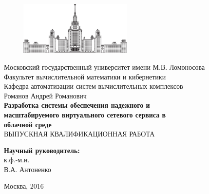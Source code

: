 \documentclass[oneside,final,14pt,a4paper]{extreport}
\begin{document}
\thispagestyle{empty}
\begin{titlepage}

\begin{figure}
	\centering
	\includegraphics[width=0.5\textwidth]{logo.eps}\\
\end{figure}

\begin{spacing}{1.0} %
\begin{center} %
	{\small
		Московский государственный университет имени М.В. Ломоносова \\
		Факультет вычислительной математики и кибернетики \\
		Кафедра автоматизации систем вычислительных комплексов \\
	}
	\vspace{4cm}
	{\large Романов Андрей Романович \\}
	\vspace{1cm}
	{\large\bfseries
		Разработка системы обеспечения надежного и \\
		масштабируемого 	виртуального сетевого сервиса в \\
		облачной среде \\
	}
	\vspace{1cm}
	ВЫПУСКНАЯ КВАЛИФИКАЦИОННАЯ  РАБОТА
\end{center}
\vfill
\begin{flushright}
\begin{small}
	{\bfseries Научный руководитель: \\}
	к.ф.-м.н. \\
	В.А. Антоненко \\
\end{small}
\end{flushright}

\vfill

\centerline{Москва, 2016}
\end{spacing}
\end{titlepage}
\setcounter{page}{2}
\end{document}
